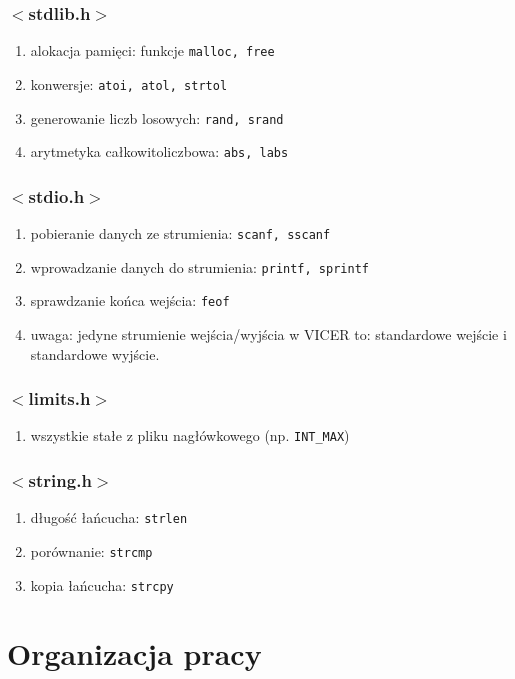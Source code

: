 \documentclass[a4paper,twoside,openright,11pt]{report}
\begin{document}
  \subsection {$<$stdlib.h$>$}
    \begin{enumerate}
      \item alokacja pamięci: funkcje \texttt{malloc, free}
      \item konwersje: \texttt{atoi, atol, strtol}
      \item generowanie liczb losowych: \texttt{rand, srand}
      \item arytmetyka całkowitoliczbowa: \texttt{abs, labs}
    \end{enumerate}
  \subsection {$<$stdio.h$>$}
    \begin{enumerate}
      \item pobieranie danych ze strumienia: \texttt{scanf, sscanf}
      \item wprowadzanie danych do strumienia: \texttt{printf, sprintf}
      \item sprawdzanie końca wejścia: \texttt{feof}
      \item uwaga: jedyne strumienie wejścia/wyjścia w VICER to: standardowe wejście i standardowe wyjście.
    \end{enumerate}
  \subsection {$<$limits.h$>$}
    \begin{enumerate}
      \item wszystkie stałe z pliku nagłówkowego (np. \texttt{INT\_MAX})
    \end{enumerate}
  \subsection {$<$string.h$>$}
    \begin{enumerate}
      \item długość łańcucha: \texttt{strlen}
      \item porównanie: \texttt{strcmp}
      \item kopia łańcucha: \texttt{strcpy}
    \end{enumerate}

  \chapter {Organizacja pracy}
\end{document}
